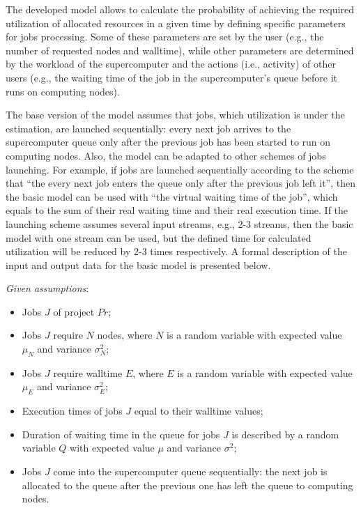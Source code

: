 The developed model allows to calculate the probability of achieving the required utilization of allocated resources in a given time by defining specific parameters for jobs processing. Some of these parameters are set by the user (e.g., the number of requested nodes and walltime), while other parameters are determined by the workload of the supercomputer and the actions (i.e., activity) of other users (e.g., the waiting time of the job in the supercomputer's queue before it runs on computing nodes).

The base version of the model assumes that jobs, which utilization is under the estimation, are launched sequentially: every next job arrives to the supercomputer queue only after the previous job has been started to run on computing nodes. Also, the model can be adapted to other schemes of jobs launching. For example, if jobs are launched sequentially according to the scheme that ``the every next job enters the queue only after the previous job left it'', then the basic model can be used with ``the virtual waiting time of the job'', which equals to the sum of their real waiting time and their real execution time. If the launching scheme assumes several input streams, e.g., 2-3 streams, then the basic model with one stream can be used, but the defined time for calculated utilization will be reduced by 2-3 times respectively. A formal description of the input and output data for the basic model is presented below.

\textit{Given assumptions}:
\begin{itemize}
    \item Jobs $J$ of project $Pr$;
    \item Jobs $J$ require $N$ nodes, where $N$ is a random variable with expected value $\mu_{N}$ and variance $\sigma_{N}^2$;
    \item Jobs $J$ require walltime $E$, where $E$ is a random variable with expected value $\mu_{E}$ and variance $\sigma_{E}^2$;
    \item Execution times of jobs $J$ equal to their walltime values;
    \item Duration of waiting time in the queue for jobs $J$ is described by a random variable $Q$ with expected value $\mu$ and variance $\sigma^2$;
    \item Jobs $J$ come into the supercomputer queue sequentially: the next job is allocated to the queue after the previous one has left the queue to computing nodes.
\end{itemize}

